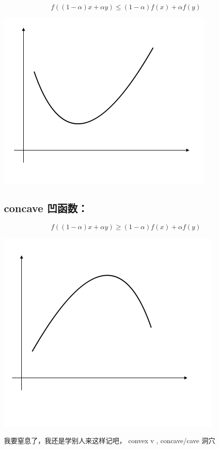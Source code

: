 \documentclass[
]{book}
\begin{document}
\[{\displaystyle f((1-\alpha )x+\alpha y)\leq (1-\alpha )f(x)+\alpha f(y)}\]

\includegraphics{images/ConvexDef.png}

\hypertarget{concave-ux51f9ux51fdux6570}{%
\subsection{concave 凹函数：}\label{concave-ux51f9ux51fdux6570}}

\[{\displaystyle f((1-\alpha )x+\alpha y)\geq (1-\alpha )f(x)+\alpha f(y)}\]

\includegraphics{images/ConcaveDef.png}

我要窒息了，我还是学别人来这样记吧， convex v , concave/cave 洞穴
\end{document}
